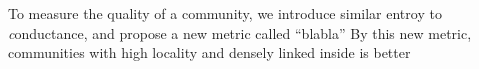  To measure the quality of a community,
 we introduce similar entroy to \textit conductance,
 and propose a new metric called ``blabla''
 By this new metric,
 communities with high locality and densely linked inside is better

 

